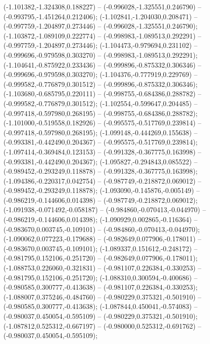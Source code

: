 (-1.101382,-1.324308,0.188227) -- (-0.996028,-1.325551,0.246790) -- (-0.993795,-1.451264,0.212406);
 (-1.102841,-1.204030,0.208471) -- (-0.997759,-1.204897,0.273446) -- (-0.996028,-1.325551,0.246790);
 (-1.103872,-1.089109,0.222774) -- (-0.998983,-1.089513,0.292291) -- (-0.997759,-1.204897,0.273446);
 (-1.104473,-0.979694,0.231102) -- (-0.999696,-0.979598,0.303270) -- (-0.998983,-1.089513,0.292291);
 (-1.104641,-0.875922,0.233436) -- (-0.999896,-0.875332,0.306346) -- (-0.999696,-0.979598,0.303270);
 (-1.104376,-0.777919,0.229769) -- (-0.999582,-0.776879,0.301512) -- (-0.999896,-0.875332,0.306346);
 (-1.103680,-0.685795,0.220111) -- (-0.998755,-0.684386,0.288782) -- (-0.999582,-0.776879,0.301512);
 (-1.102554,-0.599647,0.204485) -- (-0.997418,-0.597980,0.268195) -- (-0.998755,-0.684386,0.288782);
 (-1.101000,-0.519558,0.182926) -- (-0.995575,-0.517769,0.239814) -- (-0.997418,-0.597980,0.268195);
 (-1.099148,-0.444269,0.155638) -- (-0.993381,-0.442490,0.204367) -- (-0.995575,-0.517769,0.239814);
 (-1.097414,-0.369484,0.123153) -- (-0.991328,-0.367775,0.163998) -- (-0.993381,-0.442490,0.204367);
 (-1.095827,-0.294843,0.085522) -- (-0.989452,-0.293249,0.118878) -- (-0.991328,-0.367775,0.163998);
 (-1.094386,-0.220317,0.042754) -- (-0.987749,-0.218872,0.069012) -- (-0.989452,-0.293249,0.118878);
 (-1.093090,-0.145876,-0.005149) -- (-0.986219,-0.144606,0.014398) -- (-0.987749,-0.218872,0.069012);
 (-1.091938,-0.071492,-0.058187) -- (-0.984860,-0.070413,-0.044970) -- (-0.986219,-0.144606,0.014398);
 (-1.090929,0.002865,-0.116364) -- (-0.983670,0.003745,-0.109101) -- (-0.984860,-0.070413,-0.044970);
 (-1.090062,0.077223,-0.179688) -- (-0.982649,0.077906,-0.178011) -- (-0.983670,0.003745,-0.109101);
 (-1.089337,0.151612,-0.248172) -- (-0.981795,0.152106,-0.251720) -- (-0.982649,0.077906,-0.178011);
 (-1.088753,0.226060,-0.321831) -- (-0.981107,0.226384,-0.330253) -- (-0.981795,0.152106,-0.251720);
 (-1.088310,0.300594,-0.400686) -- (-0.980585,0.300777,-0.413638) -- (-0.981107,0.226384,-0.330253);
 (-1.088007,0.375246,-0.484760) -- (-0.980229,0.375321,-0.501910) -- (-0.980585,0.300777,-0.413638);
 (-1.087844,0.450041,-0.574083) -- (-0.980037,0.450054,-0.595109) -- (-0.980229,0.375321,-0.501910);
 (-1.087812,0.525312,-0.667197) -- (-0.980000,0.525312,-0.691762) -- (-0.980037,0.450054,-0.595109);
